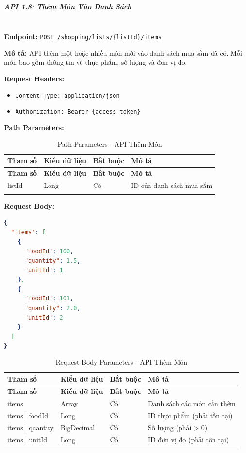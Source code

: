 \normalsize

\subparagraph{API 1.8: Thêm Món Vào Danh Sách}~\\

\textbf{Endpoint:} \texttt{POST /shopping/lists/\{listId\}/items}

\textbf{Mô tả:} API thêm một hoặc nhiều món mới vào danh sách mua sắm đã có. Mỗi món bao gồm thông tin về thực phẩm, số lượng và đơn vị đo.

\textbf{Request Headers:}
\begin{itemize}
    \item \texttt{Content-Type: application/json}
    \item \texttt{Authorization: Bearer \{access\_token\}}
\end{itemize}

\textbf{Path Parameters:}

\small
\begin{longtable}{|>{\raggedright\arraybackslash}p{3cm}|>{\raggedright\arraybackslash}p{2.5cm}|>{\raggedright\arraybackslash}p{2cm}|>{\raggedright\arraybackslash}p{6cm}|}
\hline
\textbf{Tham số} & \textbf{Kiểu dữ liệu} & \textbf{Bắt buộc} & \textbf{Mô tả} \\
\hline
\endfirsthead
\hline
\textbf{Tham số} & \textbf{Kiểu dữ liệu} & \textbf{Bắt buộc} & \textbf{Mô tả} \\
\hline
\endhead
listId & Long & Có & ID của danh sách mua sắm \\
\hline
\caption{Path Parameters - API Thêm Món}
\end{longtable}

\textbf{Request Body:}

\begin{lstlisting}[language=json, caption=Request Body API 1.8]
{
  "items": [
    {
      "foodId": 100,
      "quantity": 1.5,
      "unitId": 1
    },
    {
      "foodId": 101,
      "quantity": 2.0,
      "unitId": 2
    }
  ]
}
\end{lstlisting}

\small
\begin{longtable}{|>{\raggedright\arraybackslash}p{3cm}|>{\raggedright\arraybackslash}p{2.5cm}|>{\raggedright\arraybackslash}p{2cm}|>{\raggedright\arraybackslash}p{6cm}|}
\hline
\textbf{Tham số} & \textbf{Kiểu dữ liệu} & \textbf{Bắt buộc} & \textbf{Mô tả} \\
\hline
\endfirsthead
\hline
\textbf{Tham số} & \textbf{Kiểu dữ liệu} & \textbf{Bắt buộc} & \textbf{Mô tả} \\
\hline
\endhead
items & Array & Có & Danh sách các món cần thêm \\
\hline
items[].foodId & Long & Có & ID thực phẩm (phải tồn tại) \\
\hline
items[].quantity & BigDecimal & Có & Số lượng (phải > 0) \\
\hline
items[].unitId & Long & Có & ID đơn vị đo (phải tồn tại) \\
\hline
\caption{Request Body Parameters - API Thêm Món}
\end{longtable}

